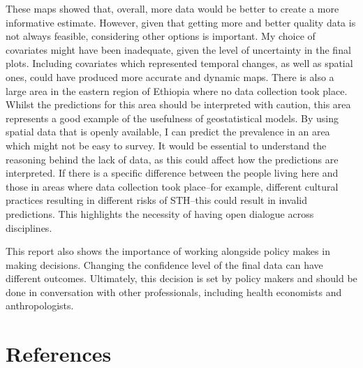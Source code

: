 \documentclass[
]{article}
\begin{document}
These maps showed that, overall, more data would be better to create a
more informative estimate. However, given that getting more and better
quality data is not always feasible, considering other options is
important. My choice of covariates might have been inadequate, given the
level of uncertainty in the final plots. Including covariates which
represented temporal changes, as well as spatial ones, could have
produced more accurate and dynamic maps. There is also a large area in
the eastern region of Ethiopia where no data collection took place.
Whilst the predictions for this area should be interpreted with caution,
this area represents a good example of the usefulness of geostatistical
models. By using spatial data that is openly available, I can predict
the prevalence in an area which might not be easy to survey. It would be
essential to understand the reasoning behind the lack of data, as this
could affect how the predictions are interpreted. If there is a specific
difference between the people living here and those in areas where data
collection took place--for example, different cultural practices
resulting in different risks of STH--this could result in invalid
predictions. This highlights the necessity of having open dialogue
across disciplines.

This report also shows the importance of working alongside policy makes
in making decisions. Changing the confidence level of the final data can
have different outcomes. Ultimately, this decision is set by policy
makers and should be done in conversation with other professionals,
including health economists and anthropologists.

\hypertarget{references}{%
\section*{References}\label{references}}
\end{document}
